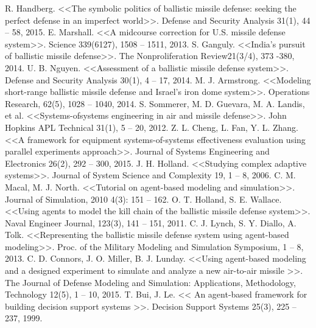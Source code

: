 \newpage
\parindent=1cm %


\begin{thebibliography}{}
	 R. Handberg. <<The symbolic politics of ballistic missile defense: seeking the perfect defense in an imperfect world>>. Defense and Security Analysis 31(1), 44 – 58, 2015.
	 E. Marshall. <<A midcourse correction for U.S. missile defense	system>>. Science 339(6127), 1508 – 1511, 2013.
	 S. Ganguly. <<India’s pursuit of ballistic missile defense>>. The	Nonproliferation Review21(3/4),  373 -380, 2014.
	 U. B. Nguyen. <<Assessment of a ballistic missile defense system>>. Defense and Security Analysis  30(1), 4 – 17, 2014.
	 M. J. Armstrong. <<Modeling short-range ballistic missile defense and Israel’s iron dome system>>. Operations Research, 62(5), 1028 – 1040, 2014.
	 S. Sommerer, M. D. Guevara, M. A. Landis, et al. <<Systems-ofsystems engineering in air and missile defense>>. John Hopkins
	APL Technical 31(1), 5 – 20, 2012.
	  Z. L. Cheng, L. Fan, Y. L. Zhang. <<A framework for equipment systems-of-systems effectiveness evaluation using parallel experiments approach>>. Journal of Systems Engineering and	Electronics 26(2), 292 – 300, 2015.
	 J. H. Holland. <<Studying complex adaptive systems>>. Journal of	System Science and Complexity 19, 1 – 8, 2006.
	 C. M. Macal, M. J. North. <<Tutorial on agent-based modeling
	and simulation>>. Journal of Simulation, 2010 4(3): 151 – 162.
	 O. T. Holland, S. E. Wallace. <<Using agents to model the kill
	chain of the ballistic missile defense system>>. Naval Engineer 	Journal, 123(3), 141 – 151, 2011.
	  C. J. Lynch, S. Y. Diallo, A. Tolk. <<Representing the ballistic 	missile defense system using agent-based modeling>>. Proc. of
	the Military Modeling and Simulation Symposium, 1 – 8, 2013.
	  C. D. Connors, J. O. Miller, B. J. Lunday. <<Using agent-based	modeling and a designed experiment to simulate and analyze a	new air-to-air missile >>. The Journal of Defense Modeling and	Simulation: Applications, Methodology, Technology 12(5), 1 – 10, 2015.
	  T. Bui, J. Le. << An agent-based framework for building decision support systems >>. Decision Support Systems 25(3),	225 – 237, 1999.

\end{thebibliography}
